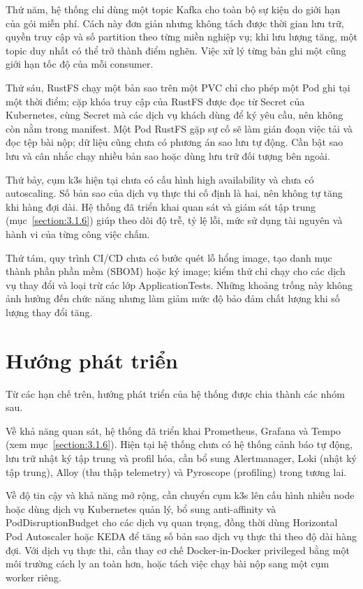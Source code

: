 \documentclass[../BTL.tex]{subfiles}
\begin{document}
Thứ năm, hệ thống chỉ dùng một topic Kafka cho toàn bộ sự kiện do giới hạn của gói miễn phí. Cách này đơn giản nhưng không tách được thời gian lưu trữ, quyền truy cập và số partition theo từng miền nghiệp vụ; khi lưu lượng tăng, một topic duy nhất có thể trở thành điểm nghẽn. Việc xử lý từng bản ghi một cũng giới hạn tốc độ của mỗi consumer.

Thứ sáu, RustFS chạy một bản sao trên một PVC chỉ cho phép một Pod ghi tại một thời điểm; cặp khóa truy cập của RustFS được đọc từ Secret của Kubernetes, cùng Secret mà các dịch vụ khách dùng để ký yêu cầu, nên không còn nằm trong manifest. Một Pod RustFS gặp sự cố sẽ làm gián đoạn việc tải và đọc tệp bài nộp; dữ liệu cũng chưa có phương án sao lưu tự động. Cần bật sao lưu và cân nhắc chạy nhiều bản sao hoặc dùng lưu trữ đối tượng bên ngoài.

Thứ bảy, cụm k3s hiện tại chưa có cấu hình high availability và chưa có autoscaling. Số bản sao của dịch vụ thực thi cố định là hai, nên không tự tăng khi hàng đợi dài. Hệ thống đã triển khai quan sát và giám sát tập trung (mục~\ref{section:3.1.6}) giúp theo dõi độ trễ, tỷ lệ lỗi, mức sử dụng tài nguyên và hành vi của từng công việc chấm.

Thứ tám, quy trình CI/CD chưa có bước quét lỗ hổng image, tạo danh mục thành phần phần mềm (SBOM) hoặc ký image; kiểm thử chỉ chạy cho các dịch vụ thay đổi và loại trừ các lớp ApplicationTests. Những khoảng trống này không ảnh hưởng đến chức năng nhưng làm giảm mức độ bảo đảm chất lượng khi số lượng thay đổi tăng.

\section{Hướng phát triển}
\label{section:3.3}

Từ các hạn chế trên, hướng phát triển của hệ thống được chia thành các nhóm sau.

Về khả năng quan sát, hệ thống đã triển khai Prometheus, Grafana và Tempo (xem mục~\ref{section:3.1.6}). Hiện tại hệ thống chưa có hệ thống cảnh báo tự động, lưu trữ nhật ký tập trung và profil hóa, cần bổ sung Alertmanager, Loki (nhật ký tập trung), Alloy (thu thập telemetry) và Pyroscope (profiling) trong tương lai.

Về độ tin cậy và khả năng mở rộng, cần chuyển cụm k3s lên cấu hình nhiều node hoặc dùng dịch vụ Kubernetes quản lý, bổ sung anti-affinity và PodDisruptionBudget cho các dịch vụ quan trọng, đồng thời dùng Horizontal Pod Autoscaler hoặc KEDA để tăng số bản sao dịch vụ thực thi theo độ dài hàng đợi. Với dịch vụ thực thi, cần thay cơ chế Docker-in-Docker privileged bằng một môi trường cách ly an toàn hơn, hoặc tách việc chạy bài nộp sang một cụm worker riêng.
\end{document}
